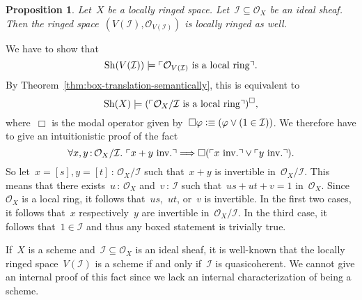 \documentclass[10pt,reqno,a4paper]{amsbook}
\makeatletter
\theoremstyle{definition}
\theoremstyle{plain}
\newtheorem{prop}[defn]{Proposition}
\theoremstyle{remark}
\renewcommand{\O}{\mathcal{O}}
\newcommand{\I}{\mathcal{I}}
\newcommand{\Sh}{\mathrm{Sh}}
\newcommand{\?}{\,{:}\,}
\renewcommand{\_}{\mathpunct{.}\,}
\newcommand{\speak}[1]{\ulcorner\text{\textnormal{#1}}\urcorner}
\newcommand{\inv}{inv.\@}
\newcommand{\defequiv}{\vcentcolon\equiv}
\renewenvironment{proof}[1][\proofname]{\par
  \pushQED{\qed}%
  \normalfont \topsep6\p@\@plus6\p@\relax
  \trivlist
  \item[\hskip\labelsep
        \itshape
    #1\@addpunct{.}]\ignorespaces
}{%
  \popQED\endtrivlist\@endpefalse
}
\makeatother
\begin{document}
\begin{prop}Let~$X$ be a locally ringed space. Let~$\I \subseteq \O_X$ be an
ideal sheaf. Then the ringed space~$(V(\I), \O_{V(\I)})$ is locally
ringed as well.\end{prop}
\begin{proof}We have to show that
\[ \Sh(V(\I)) \models \speak{$\O_{V(\I)}$ is a local ring}. \]
By Theorem~\ref{thm:box-translation-semantically}, this is equivalent to
\[ \Sh(X) \models (\speak{$\O_X/\I$ is a local ring})^\Box, \]
where~$\Box$ is the modal operator given by~$\Box\varphi \defequiv (\varphi \vee
(1 \in \I))$. We therefore have to give an intuitionistic proof of the fact
\[ \forall x,y\?\O_X/\I\_ \speak{$x+y$ \inv} \Longrightarrow
  \Box(\speak{$x$ \inv} \vee \speak{$y$ \inv}). \]
So let~$x = [s], y = [t] \? \O_X/\I$ such that~$x + y$ is invertible
in~$\O_X/\I$. This means that there exists~$u\?\O_X$ and~$v\?\I$ such that~$us
+ ut + v = 1$ in~$\O_X$. Since~$\O_X$ is a local ring, it follows
that~$us$,~$ut$, or~$v$ is invertible. In the first two cases, it follows
that~$x$ respectively~$y$ are invertible in~$\O_X/\I$. In the third case, it
follows that~$1 \in \I$ and thus any boxed statement is trivially true.
\end{proof}

If~$X$ is a scheme and~$\I \subseteq \O_X$ is an ideal sheaf, it is well-known
that the locally ringed space~$V(\I)$ is a scheme if and only if~$\I$ is
quasicoherent. We cannot give an internal proof of this fact since we lack an
internal characterization of being a scheme.
\end{document}

